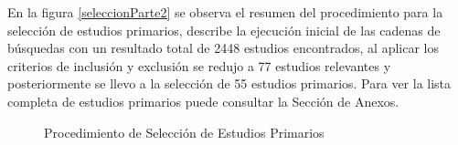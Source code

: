 \documentclass{report}
\begin{document}
            En la figura \ref{seleccionParte2}  se observa el resumen del procedimiento para la selección de estudios primarios, describe la ejecución inicial de las cadenas de búsquedas con un resultado total de 2448 estudios encontrados, al aplicar los criterios de inclusión y exclusión se redujo a 77 estudios relevantes y posteriormente se llevo a la selección de 55 estudios primarios. Para ver la lista completa de estudios primarios puede consultar la Sección de Anexos.
            
            \begin{figure}
                \centering
        		\caption{Procedimiento de Selección de Estudios Primarios}
         	\end{figure}
         	
\end{document}
